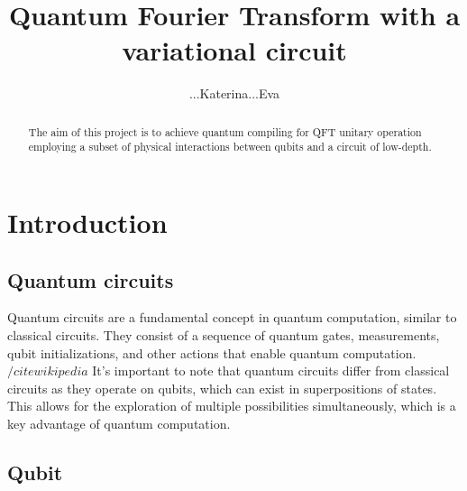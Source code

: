 \documentclass[pra,onecolumn,superscriptaddress]{revtex4}%
\begin{document}
\title{ Quantum Fourier Transform with a variational circuit }
\author{...Katerina...Eva}


\begin{abstract}
 The aim of this project is to achieve quantum compiling for QFT unitary operation
employing a subset of physical interactions between qubits and a circuit
of low-depth. 

\end{abstract}
\maketitle

\section{Introduction}



\subsection{Quantum circuits}

Quantum circuits are a fundamental concept in quantum computation, similar to classical circuits. They consist of a sequence of quantum gates, measurements, qubit initializations, and other actions that enable quantum computation. $/cite{wikipedia}$ It's important to note that quantum circuits differ from classical circuits as they operate on qubits, which can exist in superpositions of states. This allows for the exploration of multiple possibilities simultaneously, which is a key advantage of quantum computation. 

\subsection{Qubit}
\end{document}
